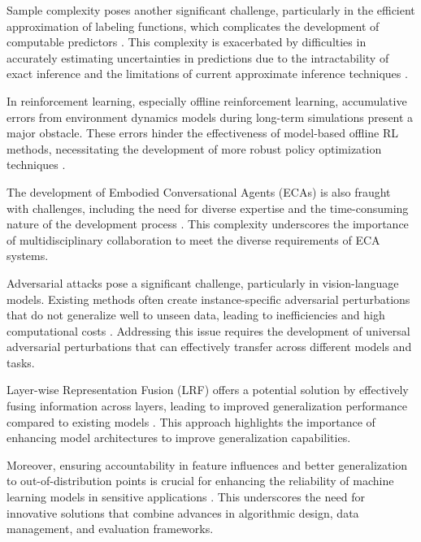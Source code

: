 Sample complexity poses another significant challenge, particularly in the efficient approximation of labeling functions, which complicates the development of computable predictors \cite{ryabko2005samplecomplexitycomputationalpattern}. This complexity is exacerbated by difficulties in accurately estimating uncertainties in predictions due to the intractability of exact inference and the limitations of current approximate inference techniques \cite{lindinger2020meanfieldstructureddeepgaussian}.



In reinforcement learning, especially offline reinforcement learning, accumulative errors from environment dynamics models during long-term simulations present a major obstacle. These errors hinder the effectiveness of model-based offline RL methods, necessitating the development of more robust policy optimization techniques \cite{wang2023environmenttransformerpolicyoptimization}.



The development of Embodied Conversational Agents (ECAs) is also fraught with challenges, including the need for diverse expertise and the time-consuming nature of the development process \cite{korre2023takesvillagemultidisciplinaritycollaboration}. This complexity underscores the importance of multidisciplinary collaboration to meet the diverse requirements of ECA systems.



Adversarial attacks pose a significant challenge, particularly in vision-language models. Existing methods often create instance-specific adversarial perturbations that do not generalize well to unseen data, leading to inefficiencies and high computational costs \cite{zhang2024universaladversarialperturbationsvisionlanguage}. Addressing this issue requires the development of universal adversarial perturbations that can effectively transfer across different models and tasks.



Layer-wise Representation Fusion (LRF) offers a potential solution by effectively fusing information across layers, leading to improved generalization performance compared to existing models \cite{zheng2023layerwiserepresentationfusioncompositional}. This approach highlights the importance of enhancing model architectures to improve generalization capabilities.



Moreover, ensuring accountability in feature influences and better generalization to out-of-distribution points is crucial for enhancing the reliability of machine learning models in sensitive applications \cite{sen2018supervisingfeatureinfluence}. This underscores the need for innovative solutions that combine advances in algorithmic design, data management, and evaluation frameworks.



